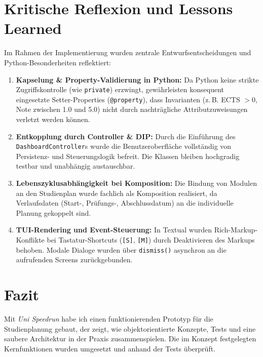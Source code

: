 \documentclass[11pt,a4paper]{article}
\begin{document}
\section{Kritische Reflexion und Lessons Learned}
Im Rahmen der Implementierung wurden zentrale Entwurfsentscheidungen und Python-Besonderheiten reflektiert:
\begin{enumerate}[leftmargin=*,noitemsep,topsep=2pt]
    \item \textbf{Kapselung \& Property-Validierung in Python:} Da Python keine strikte Zugriffskontrolle (wie \texttt{private}) erzwingt, gewährleisten konsequent eingesetzte Setter-Properties (\texttt{@property}), dass Invarianten (z.\,B. ECTS $> 0$, Note zwischen 1.0 und 5.0) nicht durch nachträgliche Attributzuweisungen verletzt werden können.
    \item \textbf{Entkopplung durch Controller \& DIP:} Durch die Einführung des \texttt{DashboardController}s wurde die Benutzeroberfläche vollständig von Persistenz- und Steuerungslogik befreit. Die Klassen bleiben hochgradig testbar und unabhängig austauschbar.
    \item \textbf{Lebenszyklusabhängigkeit bei Komposition:} Die Bindung von Modulen an den Studienplan wurde fachlich als Komposition realisiert, da Verlaufsdaten (Start-, Prüfungs-, Abschlussdatum) an die individuelle Planung gekoppelt sind.
    \item \textbf{TUI-Rendering und Event-Steuerung:} In Textual wurden Rich-Markup-Konflikte bei Tastatur-Shortcuts (\texttt{[S]}, \texttt{[M]}) durch Deaktivieren des Markups behoben. Modale Dialoge wurden über \texttt{dismiss()} asynchron an die aufrufenden Screens zurückgebunden.
\end{enumerate}

\section{Fazit}
Mit \textit{Uni Speedrun} habe ich einen funktionierenden Prototyp für die Studienplanung gebaut, der zeigt, wie objektorientierte Konzepte, Tests und eine saubere Architektur in der Praxis zusammenspielen. Die im Konzept festgelegten Kernfunktionen wurden umgesetzt und anhand der Tests überprüft.
\end{document}
